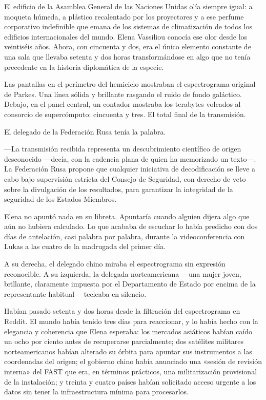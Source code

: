 \documentclass[11pt,a5paper,twoside]{book}
\begin{document}
El edificio de la Asamblea General de las Naciones Unidas olía siempre igual: a moqueta húmeda, a plástico recalentado por los proyectores y a ese perfume corporativo indefinible que emana de los sistemas de climatización de todos los edificios internacionales del mundo. Elena Vassiliou conocía ese olor desde los veintiséis años. Ahora, con cincuenta y dos, era el único elemento constante de una sala que llevaba setenta y dos horas transformándose en algo que no tenía precedente en la historia diplomática de la especie.

Las pantallas en el perímetro del hemiciclo mostraban el espectrograma original de Parkes. Una línea sólida y brillante rasgando el ruido de fondo galáctico. Debajo, en el panel central, un contador mostraba los terabytes volcados al consorcio de supercómputo: cincuenta y tres. El total final de la transmisión.

El delegado de la Federación Rusa tenía la palabra.

—La transmisión recibida representa un descubrimiento científico de origen desconocido —decía, con la cadencia plana de quien ha memorizado un texto—. La Federación Rusa propone que cualquier iniciativa de decodificación se lleve a cabo bajo supervisión estricta del Consejo de Seguridad, con derecho de veto sobre la divulgación de los resultados, para garantizar la integridad de la seguridad de los Estados Miembros.

Elena no apuntó nada en su libreta. Apuntaría cuando alguien dijera algo que aún no hubiera calculado. Lo que acababa de escuchar lo había predicho con dos días de antelación, casi palabra por palabra, durante la videoconferencia con Lukas a las cuatro de la madrugada del primer día.

A su derecha, el delegado chino miraba el espectrograma sin expresión reconocible. A su izquierda, la delegada norteamericana —una mujer joven, brillante, claramente impuesta por el Departamento de Estado por encima de la representante habitual— tecleaba en silencio.

Habían pasado setenta y dos horas desde la filtración del espectrograma en Reddit. El mundo había tenido tres días para reaccionar, y lo había hecho con la elegancia y coherencia que Elena esperaba: los mercados asiáticos habían caído un ocho por ciento antes de recuperarse parcialmente; dos satélites militares norteamericanos habían alterado su órbita para apuntar sus instrumentos a las coordenadas del origen; el gobierno chino había anunciado una «sesión de revisión interna» del FAST que era, en términos prácticos, una militarización provisional de la instalación; y treinta y cuatro países habían solicitado acceso urgente a los datos sin tener la infraestructura mínima para procesarlos.
\end{document}
